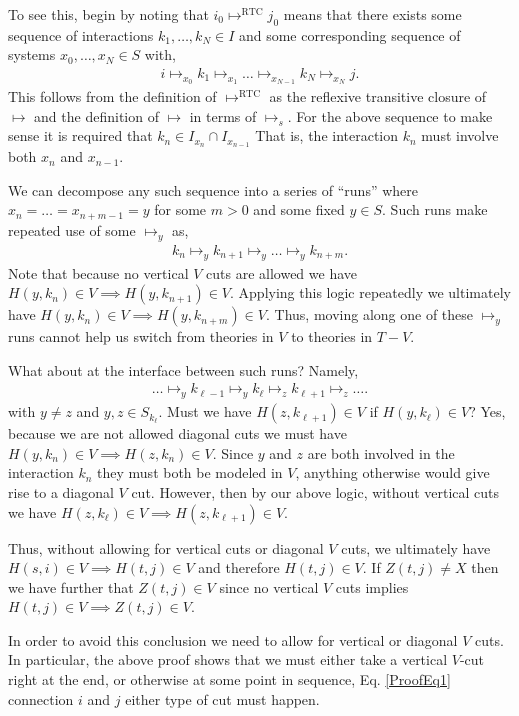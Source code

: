 \documentclass[prd,twocolumn,superscriptaddress,floatfix,amsmath,amssymb,amsfonts,nofootinbib]{revtex4-2}
\begin{document}
To see this, begin by noting that $i_0\mapsto^\text{RTC}j_0$ means that there exists some sequence of interactions $k_1,\dots,k_N\in I$ and some corresponding sequence of systems $x_0,\dots,x_N\in S$ with, 
\begin{align}\label{ProofEq1}
i\mapsto_{x_0}k_1\mapsto_{x_1}\dots\mapsto_{x_{N-1}}k_N\mapsto_{x_N} j.    
\end{align}
This follows from the definition of $\mapsto^\text{RTC}$ as the reflexive transitive closure of $\mapsto$ and the definition of $\mapsto$ in terms of $\mapsto_s$. For the above sequence to make sense it is required that $k_n\in I_{x_n}\cap I_{x_{n-1}}$ That is, the interaction $k_n$ must involve both $x_n$ and $x_{n-1}$. 

We can decompose any such sequence into a series of ``runs'' where $x_n=\dots=x_{n+m-1}=y$ for some $m>0$ and some fixed $y\in S$. Such runs make repeated use of some $\mapsto_{y}$ as,
\begin{align}
k_n\mapsto_{y}k_{n+1} \mapsto_{y}\dots\mapsto_{y}k_{n+m}. 
\end{align}
Note that because no vertical $V$ cuts are allowed we have \mbox{$H(y,k_n)\in V\implies H(y,k_{n+1})\in V$}. Applying this logic repeatedly we ultimately have \mbox{$H(y,k_n)\in V\implies H(y,k_{n+m})\in V$}. Thus, moving along one of these $\mapsto_{y}$ runs cannot help us switch from theories in $V$ to theories in $T-V$.

What about at the interface between such runs? Namely, 
\begin{align}
\dots\mapsto_{y}k_{\ell-1}\mapsto_{y}k_\ell \mapsto_{z}k_{\ell+1}\mapsto_{z}\dots. 
\end{align}
with $y\neq z$ and  $y,z\in S_{k_\ell}$. Must we have \mbox{$H(z,k_{\ell+1})\in V$} if \mbox{$H(y,k_\ell)\in V$}? Yes, because we are not allowed diagonal cuts we must have \mbox{$H(y,k_n)\in V\implies H(z,k_n)\in V$}. Since $y$ and $z$ are both involved in the interaction $k_n$ they must both be modeled in $V$, anything otherwise would give rise to a diagonal $V$ cut. However, then by our above logic, without vertical cuts we have \mbox{$H(z,k_\ell)\in V \implies H(z,k_{\ell+1})\in V$}.

Thus, without allowing for vertical cuts or diagonal $V$ cuts, we ultimately have \mbox{$H(s,i)\in V \implies H(t,j)\in V$} and therefore $H(t,j)\in V$. If $Z(t,j)\neq X$ then we have further that $Z(t,j)\in V$ since no vertical $V$ cuts implies \mbox{$H(t,j)\in V \implies Z(t,j)\in V$}.

In order to avoid this conclusion we need to allow for vertical or diagonal $V$ cuts. In particular, the above proof shows that we must either take a vertical $V$-cut right at the end, or otherwise at some point in sequence, Eq. \eqref{ProofEq1} connection $i$ and $j$ either type of cut must happen.
\end{document}

